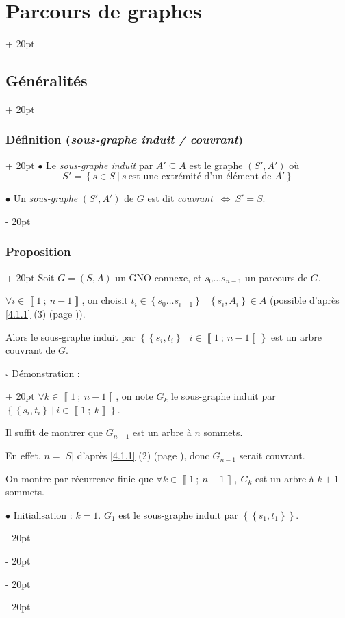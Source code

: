\documentclass[a4paper, 12pt, twoside]{article}
\newcommand{\nset}[2]{\left\llbracket #1\ ;\ #2 \right\rrbracket}
\newcommand{\set}[1]{\left\{ #1 \right\}}
\newcommand{\abs}[1]{\left\lvert #1 \right\rvert}
\newcommand{\ssi}{\ \Leftrightarrow \ }
\newcommand{\ind}[1][20pt]{\advance\leftskip + #1}
\newcommand{\deind}[1][20pt]{\advance\leftskip - #1}
\newenvironment{indt}[2][20pt]{#2 \par \ind[#1]}{\par \deind} %
\begin{document}
\begin{indt}{\section{Parcours de graphes}}
\begin{indt}{\subsection{Généralités}}
\begin{indt}{\subsubsection{Définition (\textit{sous-graphe induit / couvrant})}}
                $\bullet$ Le \textit{sous-graphe induit} par $A' \subseteq A$ est le graphe $(S', A')$ où
                \[
                    S' = \set{s \in S\ |\ s\ \text{est une extrémité d'un élément de } A'}
                \]

                $\bullet$ Un \textit{sous-graphe} $(S', A')$ de $G$ est dit \textit{couvrant} $\ssi S' = S$.
            \end{indt}

            \vspace{12pt}
            
            \begin{indt}{\subsubsection{Proposition}}
                Soit $G = (S, A)$ un GNO connexe, et $s_0 \ldots s_{n - 1}$ un parcours de $G$.

                $\forall i \in \nset 1 {n - 1}$, on choisit $t_i \in \set{s_0 \ldots s_{i - 1}}\ |\ \set{s_i, A_i} \in A$ (possible d'après \ref{4.1.1} (3) (page \pageref{4.1.1})).

                \vspace{6pt}
                
                Alors le sous-graphe induit par $\set{\set{s_i, t_i}\ |\ i \in \nset 1 {n - 1}}$ est un arbre couvrant de $G$.

                \vspace{6pt}
                
                \begin{indt}{$\square$ Démonstration :}
                    $\forall k \in \nset 1 {n - 1}$, on note $G_k$ le sous-graphe induit par $\set{\set{s_i, t_i}\ |\ i \in \nset 1 {k}}$.

                    Il suffit de montrer que $G_{n - 1}$ est un arbre à $n$ sommets.

                    En effet, $n = \abs S$ d'après \ref{4.1.1} (2) (page \pageref{4.1.1}), donc $G_{n - 1}$ serait couvrant.

                    On montre par récurrence finie que $\forall k \in \nset 1 {n - 1},\ G_k$ est un arbre à $k + 1$ sommets.

                    \vspace{6pt}
                    
                    $\bullet$ Initialisation : $k = 1$. $G_1$ est le sous-graphe induit par $\set{\set{s_1, t_1}}$.


\end{indt}
\end{indt}
\end{indt}
\end{indt}
\end{document}
